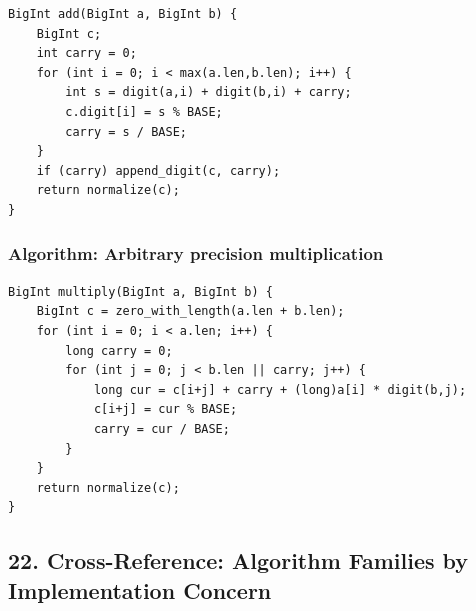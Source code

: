 \documentclass[11pt]{article}
\begin{document}
\begin{verbatim}
BigInt add(BigInt a, BigInt b) {
    BigInt c;
    int carry = 0;
    for (int i = 0; i < max(a.len,b.len); i++) {
        int s = digit(a,i) + digit(b,i) + carry;
        c.digit[i] = s % BASE;
        carry = s / BASE;
    }
    if (carry) append_digit(c, carry);
    return normalize(c);
}
\end{verbatim}

\subsubsection{Algorithm: Arbitrary precision multiplication}\label{algorithm-arbitrary-precision-multiplication}

\begin{verbatim}
BigInt multiply(BigInt a, BigInt b) {
    BigInt c = zero_with_length(a.len + b.len);
    for (int i = 0; i < a.len; i++) {
        long carry = 0;
        for (int j = 0; j < b.len || carry; j++) {
            long cur = c[i+j] + carry + (long)a[i] * digit(b,j);
            c[i+j] = cur % BASE;
            carry = cur / BASE;
        }
    }
    return normalize(c);
}
\end{verbatim}

\subsection{22. Cross-Reference: Algorithm Families by Implementation Concern}\label{cross-reference-algorithm-families-by-implementation-concern}
\end{document}
